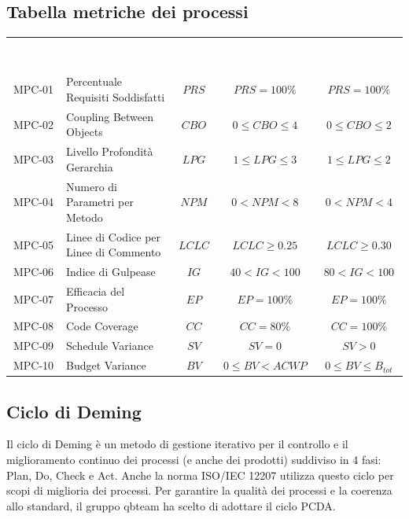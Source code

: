 \subsection{Tabella metriche dei processi}
    \renewcommand{\arraystretch}{1.5}
    \begin{longtable}{ c C{4cm} c c c}
    \textcolor{white}{\textbf{Metrica}} & \textcolor{white}{\textbf{Nome}} & \textcolor{white}{\textbf{Sigla}} & \textcolor{white}{\textbf{Valore Accettabile}} & \textcolor{white}{\textbf{Valore Ottimale}}\\
    MPC-01 & Percentuale Requisiti Soddisfatti & $PRS$ & $PRS=100\%$ & $PRS=100\%$ \\
    MPC-02 & Coupling Between Objects & $CBO$ & $0 \leq CBO \leq 4$ & $0 \leq CBO \leq 2$ \\
    MPC-03 & Livello Profondità Gerarchia & $LPG$ &  $1 \leq LPG \leq 3$ &  $1 \leq LPG \leq 2$ \\
    MPC-04 & Numero di Parametri per Metodo & $NPM$ & $0 < NPM < 8$ & $ 0 < NPM < 4$ \\
    MPC-05 & Linee di Codice per Linee di Commento & $LCLC$ & $LCLC \geq 0.25$ & $LCLC \geq 0.30$ \\
    MPC-06 & Indice di Gulpease & $IG$ & $40 < IG < 100$ & $80 < IG < 100$ \\
    MPC-07 & Efficacia del Processo & $EP$ & $EP = 100\%$ & $EP = 100\%$ \\
    MPC-08 & Code Coverage & $CC$ & $CC = 80\%$ & $CC = 100\%$  \\
    MPC-09 & Schedule Variance & $SV$ & $SV = 0$ & $SV > 0$  \\	
    MPC-10 & Budget Variance & $BV$ & $0 \leq BV < ACWP$ & $0 \leq BV \leq B_{tot}$  \\
    \end{longtable}

\subsection{Ciclo di Deming}
    Il ciclo di Deming è un metodo di gestione iterativo per il controllo e il miglioramento continuo dei processi (e anche dei prodotti) suddiviso in 4 fasi: Plan, Do, Check e Act. 
    Anche la norma ISO/IEC 12207 utilizza questo ciclo per scopi di miglioria dei processi. Per garantire la qualità dei processi e la coerenza allo standard, il gruppo qbteam 
    ha scelto di adottare il ciclo PCDA.

